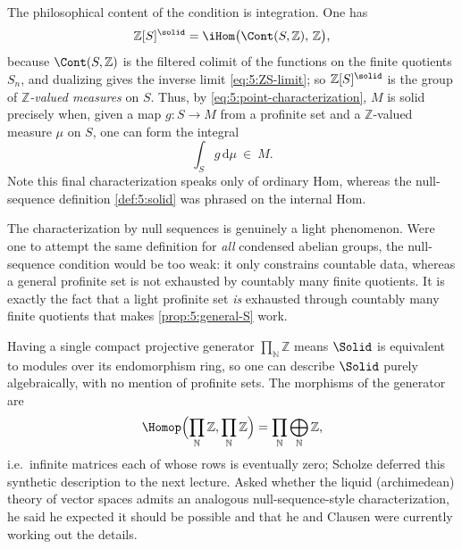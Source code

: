 \begin{remark}
\label{rmk:5:measures}
The philosophical content of the condition is integration. One has
\begin{equation*}
\mathbb{Z}[S]^{\solid}=\iHom\bigl(\Cont(S,\mathbb{Z}),\,\mathbb{Z}\bigr),
\end{equation*}
because $\Cont(S,\mathbb{Z})$ is the filtered colimit of the functions on the
finite quotients $S_n$, and dualizing gives the inverse limit
\eqref{eq:5:ZS-limit}; so $\mathbb{Z}[S]^{\solid}$ is the group of
\emph{$\mathbb{Z}$-valued measures} on $S$. Thus, by \eqref{eq:5:point-characterization},
$M$ is solid precisely when, given a map $g\colon S\to M$ from a profinite set and
a $\mathbb{Z}$-valued measure $\mu$ on $S$, one can form the integral
\begin{equation*}
\int_{S}g\,\mathrm{d}\mu\ \in\ M .
\end{equation*}
Note this final characterization speaks only of ordinary Hom, whereas the
null-sequence definition \cref{def:5:solid} was phrased on the internal Hom.
\end{remark}

\begin{remark}
\label{rmk:5:lightness-essential}
The characterization by null sequences is genuinely a light phenomenon. Were one
to attempt the same definition for \emph{all} condensed abelian groups, the
null-sequence condition would be too weak: it only constrains countable data,
whereas a general profinite set is not exhausted by countably many finite
quotients. It is exactly the fact that a light profinite set \emph{is} exhausted
through countably many finite quotients that makes \cref{prop:5:general-S} work.
\end{remark}

\begin{remark}
\label{rmk:5:synthetic-and-liquid}
Having a single compact projective generator $\prod_{\mathbb{N}}\mathbb{Z}$ means
$\Solid$ is equivalent to modules over its endomorphism ring, so one can describe
$\Solid$ purely algebraically, with no mention of profinite sets. The morphisms of
the generator are
\begin{equation*}
\Homop\Bigl(\prod_{\mathbb{N}}\mathbb{Z},\prod_{\mathbb{N}}\mathbb{Z}\Bigr)
=\prod_{\mathbb{N}}\bigoplus_{\mathbb{N}}\mathbb{Z},
\end{equation*}
i.e.\ infinite matrices each of whose rows is eventually zero; Scholze deferred
this synthetic description to the next lecture. Asked whether the liquid
(archimedean) theory of vector spaces admits an analogous null-sequence-style
characterization, he said he expected it should be possible and that he and
Clausen were currently working out the details.
\end{remark}
